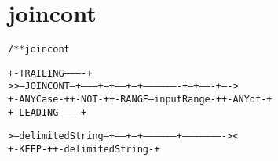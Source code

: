 \section{joincont}
\begin{shaded}
\begin{alltt}
/** joincont


                                       +-TRAILING----------+
   >>--JOINCONT--+---------+--+-----+--+-------------------+--+-------+---->
                 +-ANYCase-+  +-NOT-+  +-RANGE--inputRange-+  +-ANYof-+
                                       +-LEADING-----------+

   >--delimitedString--+------+--+-----------------+----------------------><
                       +-KEEP-+  +-delimitedString-+


\end{alltt}
\end{shaded}
